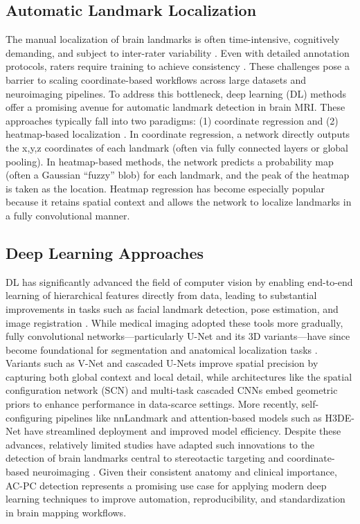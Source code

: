 \subsection{Automatic Landmark Localization}
The manual localization of brain landmarks is often time-intensive, cognitively demanding, and subject to inter-rater variability \cite{Abbass2022-lf, Lau2019-eh,Pallavaram2008-zr}. Even with detailed annotation protocols, raters require training to achieve consistency \cite{Lau2019-eh}. These challenges pose a barrier to scaling coordinate-based workflows across large datasets and neuroimaging pipelines. To address this bottleneck, deep learning (DL) methods offer a promising avenue for automatic landmark detection in brain MRI. These approaches typically fall into two paradigms: (1) coordinate regression \cite{Neupane2024-vt} and (2) heatmap-based localization \cite{Payer2016-ik}. In coordinate regression, a network directly outputs the x,y,z coordinates of each landmark (often via fully connected layers or global pooling). In heatmap-based methods, the network predicts a probability map (often a Gaussian “fuzzy” blob) for each landmark, and the peak of the heatmap is taken as the location. Heatmap regression has become especially popular because it retains spatial context and allows the network to localize landmarks in a fully convolutional manner.

\subsection{Deep Learning Approaches}
DL has significantly advanced the field of computer vision by enabling end-to-end learning of hierarchical features directly from data, leading to substantial improvements in tasks such as facial landmark detection, pose estimation, and image registration \cite{Lathuiliere2018-oy}. While medical imaging adopted these tools more gradually, fully convolutional networks—particularly U-Net and its 3D variants—have since become foundational for segmentation and anatomical localization tasks \cite{Akkus2017-eh, Falk2019-us}. Variants such as V-Net and cascaded U-Nets improve spatial precision by capturing both global context and local detail, while architectures like the spatial configuration network (SCN) \cite{Payer2016-ik, Payer2019-sn} and multi-task cascaded CNNs \cite{Zhang2017-dc} embed geometric priors to enhance performance in data-scarce settings. More recently, self-configuring pipelines like nnLandmark \cite{Ertl2025-wu} and attention-based models such as H3DE-Net \cite{Huang2025-vt} have streamlined deployment and improved model efficiency. Despite these advances, relatively limited studies have adapted such innovations to the detection of brain landmarks central to stereotactic targeting and coordinate-based neuroimaging \cite{Edwards2021-su}. Given their consistent anatomy and clinical importance, AC-PC detection represents a promising use case for applying modern deep learning techniques to improve automation, reproducibility, and standardization in brain mapping workflows.

